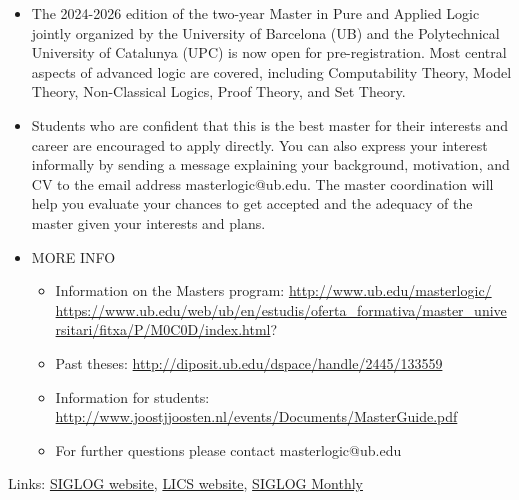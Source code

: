 \documentclass[prodmode,acmtecs]{acmsmall} %
\begin{document}
\begin{itemize}\item  The 2024-2026 edition of the two-year Master in Pure and Applied Logic jointly organized by the University of Barcelona (UB) and the Polytechnical University of Catalunya (UPC) is now open for pre-registration. Most central aspects of advanced logic are covered, including Computability Theory, Model Theory, Non-Classical Logics, Proof Theory, and Set Theory. 
 
\item  Students who are confident that this is the best master for their interests and career are encouraged to apply directly. You can also express your interest informally by sending a message explaining your background, motivation, and CV to the email address masterlogic@ub.edu. The master coordination will help you evaluate your chances to get accepted and the adequacy of the master given your interests and plans. 
 
\item  MORE INFO  
 
\begin{itemize}\item  Information on the Masters program: \href{http://www.ub.edu/masterlogic/}{http://www.ub.edu/masterlogic/} \href{https://www.ub.edu/web/ub/en/estudis/oferta_formativa/master_universitari/fitxa/P/M0C0D/index.html}{https://www.ub.edu/web/ub/en/estudis/oferta\_formativa/master\_universitari/fitxa/P/M0C0D/index.html}?
\item  Past theses: \href{http://diposit.ub.edu/dspace/handle/2445/133559}{http://diposit.ub.edu/dspace/handle/2445/133559}
\item  Information for students: \href{http://www.joostjjoosten.nl/events/Documents/MasterGuide.pdf}{http://www.joostjjoosten.nl/events/Documents/MasterGuide.pdf}
\item  For further questions please contact masterlogic@ub.edu
\end{itemize} 
\end{itemize}


\bigskip Links: \href{http://siglog.org/}{SIGLOG website}, \href{https://lics.siglog.org}{LICS website}, \href{https://lics.siglog.org/newsletters/}{SIGLOG Monthly}
\end{document}
